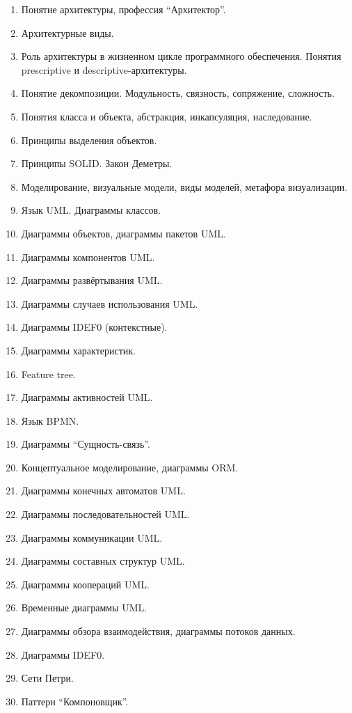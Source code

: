 \documentclass[a5paper]{article}
\begin{document}
\begin{enumerate}
    \item Понятие архитектуры, профессия \enquote{Архитектор}.
    \item Архитектурные виды.
    \item Роль архитектуры в жизненном цикле программного обеспечения. Понятия prescriptive и descriptive-архитектуры.
    \item Понятие декомпозиции. Модульность, связность, сопряжение, сложность.
    \item Понятия класса и объекта, абстракция, инкапсуляция, наследование. 
    \item Принципы выделения объектов.
    \item Принципы SOLID. Закон Деметры.
    \item Моделирование, визуальные модели, виды моделей, метафора визуализации.
    \item Язык UML. Диаграммы классов.
    \item Диаграммы объектов, диаграммы пакетов UML.
    \item Диаграммы компонентов UML.
    \item Диаграммы развёртывания UML.
    \item Диаграммы случаев использования UML.
    \item Диаграммы IDEF0 (контекстные).
    \item Диаграммы характеристик.
    \item Feature tree.
    \item Диаграммы активностей UML.
    \item Язык BPMN.
    \item Диаграммы \enquote{Сущность-связь}.
    \item Концептуальное моделирование, диаграммы ORM.
    \item Диаграммы конечных автоматов UML.
    \item Диаграммы последовательностей UML.
    \item Диаграммы коммуникации UML.
    \item Диаграммы составных структур UML.
    \item Диаграммы коопераций UML.
    \item Временные диаграммы UML.
    \item Диаграммы обзора взаимодействия, диаграммы потоков данных.
    \item Диаграммы IDEF0.
    \item Сети Петри.
    \item Паттерн \enquote{Компоновщик}.

\end{enumerate}
\end{document}
